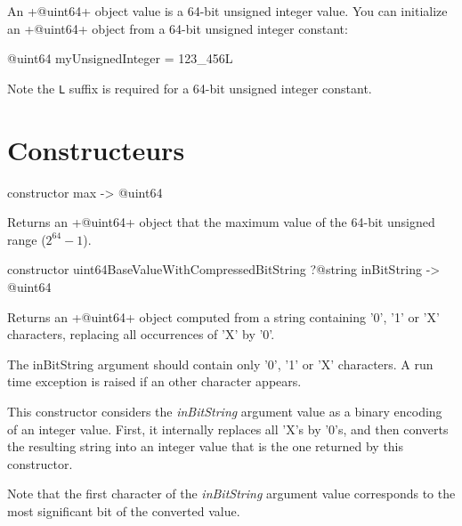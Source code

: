 


An \ggst+@uint64+ object value is a 64-bit unsigned integer value. You can initialize an \ggst+@uint64+ object from a 64-bit unsigned integer constant:

\begin{galgas3}
@uint64 myUnsignedInteger = 123_456L
\end{galgas3}

Note the \texttt{L} suffix is required for a 64-bit unsigned integer constant.

\section{Constructeurs}





\begin{galgas3}
constructor max -> @uint64
\end{galgas3}

Returns an \ggst+@uint64+ object that the maximum value of the 64-bit unsigned range ($2^{64}-1$).



\begin{galgas3}
constructor uint64BaseValueWithCompressedBitString
   ?@string inBitString
   -> @uint64
\end{galgas3}


Returns an \ggst+@uint64+ object computed from a string containing '0', '1' or 'X' characters, replacing all occurrences of 'X' by '0'.

The inBitString argument should contain only '0', '1' or 'X' characters. A run time exception is raised if an other character appears.

This constructor considers the \emph{inBitString} argument value as a binary encoding of an integer value. First, it internally replaces all 'X's by '0's, and then converts the resulting string into an integer value that is the one returned by this constructor.

Note that the first character of the \emph{inBitString} argument value corresponds to the most significant bit of the converted value.


